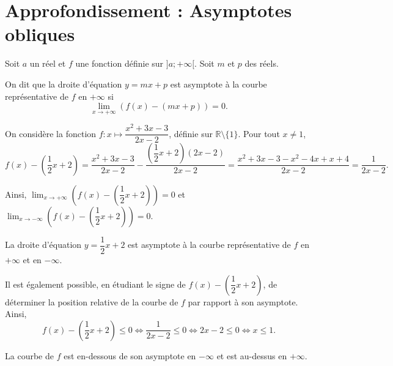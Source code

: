 \documentclass[11pt,fleqn, openany]{book} %
\begin{document}
\section{Approfondissement : Asymptotes obliques}

\begin{definition}Soit $a$ un réel et $f$ une fonction définie sur $]a;+\infty[$. Soit $m$ et $p$ des réels. 

On dit que la droite d'équation $y=mx+p$ est asymptote à la courbe représentative de $f$ en $+\infty$ si \[\displaystyle \lim_{x \to +\infty} (f(x)-(mx+p))=0.\]\end{definition}


\begin{example} On considère la fonction $f:x\mapsto \dfrac{x^2+3x-3}{2x-2}$, définie sur $\mathbb{R}\setminus \{1\}$. Pour tout $x\neq 1$, 
\[f(x)-\left(\dfrac{1}{2}x+2\right)=\dfrac{x^2+3x-3}{2x-2}-\dfrac{\left(\dfrac{1}{2}x+2\right)(2x-2)}{2x-2}=\dfrac{x^2+3x-3-x^2-4x+x+4}{2x-2}=\dfrac{1}{2x-2}.\]

Ainsi, $\displaystyle \lim_{x \to +\infty} \left(f(x)-\left(\dfrac{1}{2}x+2\right)\right)=0$ et $\displaystyle \lim_{x \to -\infty} \left(f(x)-\left(\dfrac{1}{2}x+2\right)\right)=0$. 

La droite d'équation $y=\dfrac{1}{2}x+2$ est asymptote à la courbe représentative de $f$ en $+\infty$ et en $-\infty$.

Il est également possible, en étudiant le signe de $f(x)-\left(\dfrac{1}{2}x+2\right)$, de déterminer la position relative de la courbe de $f$ par rapport à son asymptote.
Ainsi, 
\[ f(x)-\left(\dfrac{1}{2}x+2\right) \leqslant 0 \Leftrightarrow \dfrac{1}{2x-2} \leqslant 0 \Leftrightarrow 2x-2 \leqslant 0 \Leftrightarrow x\leqslant 1.\]

La courbe de $f$ est en-dessous de son asymptote en $-\infty$ et est au-dessus en $+\infty$.

\begin{center}
\end{center}
\vspace{-1cm}\end{example}
\end{document}
